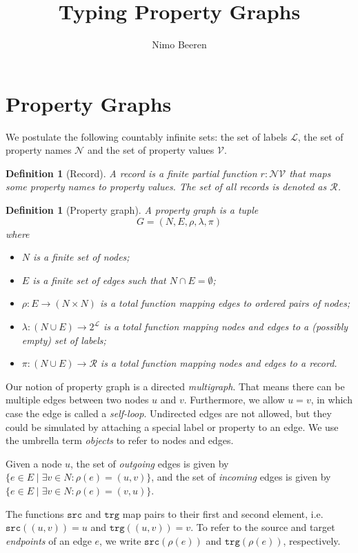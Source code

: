 \documentclass{article}
\title{Typing Property Graphs}
\author{Nimo Beeren}
\makeatletter
\newtheorem{definition}[theorem]{Definition}
\newcommand{\pto}{}%
\DeclareRobustCommand{\pto}{\mathrel{\mathpalette\p@to@gets\to}}
\newcommand{\p@to@gets}[2]{%
  \ooalign{\hidewidth$\m@th#1\mapstochar\mkern5mu$\hidewidth\cr$\m@th#1\to$\cr}%
}
\newcommand{\src}{\mathtt{src}}
\newcommand{\trg}{\mathtt{trg}}
\makeatother
\begin{document}
\section{Property Graphs}

We postulate the following countably infinite sets: the set of labels $\mathcal{L}$, the set of property names $\mathcal{N}$ and the set of property values $\mathcal{V}$.

\begin{definition}[Record]
  A \emph{record} is a finite partial function $r : \mathcal{N} \pto \mathcal{V}$ that maps some property names to property values. The set of all records is denoted as $\mathcal{R}$.
\end{definition}

\begin{definition}[Property graph]
  A \emph{property graph} is a tuple $$G = (N, E, \rho, \lambda, \pi)$$ where
  \begin{itemize}
    \item $N$ is a finite set of nodes;
    \item $E$ is a finite set of edges such that $N \cap E = \emptyset$;
    \item $\rho : E \to (N \times N)$ is a total function mapping edges to ordered pairs of nodes;
    \item $\lambda : (N \cup E) \to 2^{\mathcal{L}}$ is a total function mapping nodes and edges to a (possibly empty) set of labels;
    \item $\pi : (N \cup E) \to \mathcal{R}$ is a total function mapping nodes and edges to a record.
  \end{itemize}
\end{definition}

Our notion of property graph is a directed \emph{multigraph}. That means there can be multiple edges between two nodes $u$ and $v$. Furthermore, we allow $u = v$, in which case the edge is called a \emph{self-loop}. Undirected edges are not allowed, but they could be simulated by attaching a special label or property to an edge. We use the umbrella term \emph{objects} to refer to nodes and edges.

Given a node $u$, the set of \emph{outgoing} edges is given by $\{e \in E \mid \exists v \in N : \rho(e) = (u, v)\}$, and the set of \emph{incoming} edges is given by $\{e \in E \mid \exists v \in N : \rho(e) = (v, u)\}$.

The functions $\src$ and $\trg$ map pairs to their first and second element, i.e. $\src((u, v)) = u$ and $\trg((u, v)) = v$. To refer to the source and target \emph{endpoints} of an edge $e$, we write $\src(\rho(e))$ and $\trg(\rho(e))$, respectively.
\end{document}
